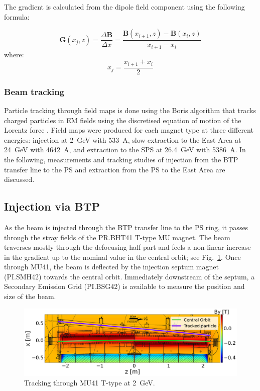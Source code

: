 The gradient is calculated from the dipole field component using the following formula:
 
$$ \boldsymbol{G}(x_{j},z) = \frac{\Delta\boldsymbol{B}}{\Delta x} = \frac{\boldsymbol{B}(x_{i+1},z) - \boldsymbol{B}(x_{i},z)}{x_{i+1}-x_{i}} $$
where:
$$ x_{j} = \frac{x_{i+1} + x_{i}}{{2}} $$

\subsubsection{Beam tracking}

Particle tracking through field maps is done using the Boris algorithm that tracks charged particles in EM fields using the discretised equation of motion of the Lorentz force \cite{dutheil_pybttrackersborispy_nodate,qin_why_2013,ripperda_comprehensive_2018}. Field maps were produced for each magnet type at three different energies: injection at \SI{2}{GeV} with \SI{533}{A}, slow extraction to the East Area at \SI{24}{GeV} with \SI{4642}{A}, and extraction to the SPS at \SI{26.4}{GeV} with \SI{5386}{A}. In the following, measurements and tracking studies of injection from the BTP transfer line to the PS and extraction from the PS to the East Area are discussed.

\subsection{Injection via BTP}
As the beam is injected through the BTP transfer line to the PS ring, it passes through the stray fields of the PR.BHT41 T-type MU magnet. The beam traverses mostly through the defocusing half part and feels a non-linear increase in the gradient up to the nominal value in the central orbit; see Fig.~\ref{fig:injection_btp}. Once through MU41, the beam is deflected by the injection septum magnet (PI.SMH42) towards the central orbit. Immediately downstream of the septum, a Secondary Emission Grid (PI.BSG42) is available to measure the position and size of the beam.

\begin{figure}[!htb]
   \centering
   \includegraphics*[width=0.7\columnwidth]{01_Introduction/images/injection_tracking.png}
   \caption{Tracking through MU41 T-type at \SI{2}{GeV}.}
   \label{fig:injection_btp}
\end{figure}

